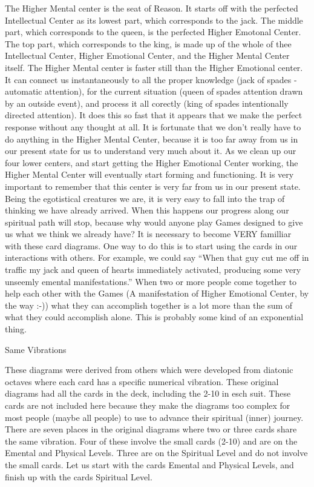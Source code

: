 \documentclass[12pt,letterpaper]{book}
\begin{document}
The Higher Mental center is the seat of Reason. It starts off with the perfected Intellectual Center as its lowest part, which corresponds to the jack. The middle part, which corresponds to the queen, is the perfected Higher Emotonal Center. The top part, which corresponds to the king, is made up of the whole of thee Intellectual Center, Higher Emotional Center, and the Higher Mental Center itself. The Higher Mental center is faster still than the Higher Emotional center. It can connect us instantaneously to all the proper knowledge (jack of spades - automatic attention), for the current situation (queen of spades attention drawn by an outside event), and process it all corectly (king of spades intentionally directed attention). It does this so fast that it appears that we make the perfect response without any thought at all. It is fortunate that we don't really have to do anything in the Higher Mental Center, because it is too far away from us in our present state for us to understand very much about it. As we clean up our four lower centers, and start getting the Higher Emotional Center working, the Higher Mental Center will eventually start forming and functioning. It is very important to remember that this center is very far from us in our present state. Being the egotistical creatures we are, it is very easy to fall into the trap of thinking we have already arrived. When this happens our progress along our spiritual path will stop, because why would anyone play Games designed to give us what we think we already have? It is necessary to become VERY familliar with these card diagrams. One way to do this is to start using the cards in our interactions with others. For example, we could say ``When that guy cut me off in traffic my jack and queen of hearts immediately activated, producing some very unseemly emental manifestations.'' When two or more people come together to help each other with the Games (A manifestation of Higher Emotional Center, by the way :-)) what they can accomplish together is a lot more than the sum of what they could accomplish alone. This is probably some kind of an exponential thing. 


Same Vibrations

These diagrams were derived from others which were developed from diatonic octaves where each card has a specific numerical vibration. These original diagrams had all the cards in the deck, including the 2-10 in esch suit. These cards are not included here because they make the diagrams too complex for most people (maybe all people) to use to advance their spiritual (inner) journey. There are seven places in the original diagrams where two or three cards share the same vibration. Four of these involve the small cards (2-10) and are on the Emental and Physical Levels. Three are on the Spiritual Level and do not involve the small cards. Let us start with the cards Emental and Physical Levels, and finish up with the cards Spiritual Level.
\end{document}
